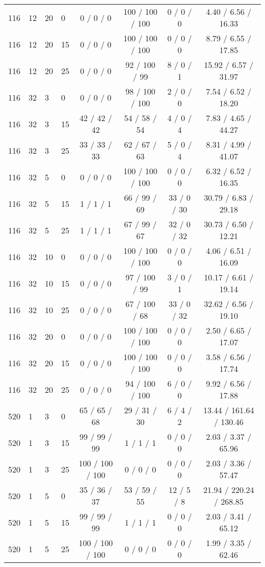 \begin{table}[p]
\begin{tabular}{llllcccc}
116 & 12 & 20 & 0 & 0 / 0 / 0 & 100 / 100 / 100 & 0 / 0 / 0 & 4.40 / 6.56 / 16.33 \\
116 & 12 & 20 & 15 & 0 / 0 / 0 & 100 / 100 / 100 & 0 / 0 / 0 & 8.79 / 6.55 / 17.85 \\
116 & 12 & 20 & 25 & 0 / 0 / 0 & 92 / 100 / 99 & 8 / 0 / 1 & 15.92 / 6.57 / 31.97 \\
116 & 32 & 3 & 0 & 0 / 0 / 0 & 98 / 100 / 100 & 2 / 0 / 0 & 7.54 / 6.52 / 18.20 \\
116 & 32 & 3 & 15 & 42 / 42 / 42 & 54 / 58 / 54 & 4 / 0 / 4 & 7.83 / 4.65 / 44.27 \\
116 & 32 & 3 & 25 & 33 / 33 / 33 & 62 / 67 / 63 & 5 / 0 / 4 & 8.31 / 4.99 / 41.07 \\
116 & 32 & 5 & 0 & 0 / 0 / 0 & 100 / 100 / 100 & 0 / 0 / 0 & 6.32 / 6.52 / 16.35 \\
116 & 32 & 5 & 15 & 1 / 1 / 1 & 66 / 99 / 69 & 33 / 0 / 30 & 30.79 / 6.83 / 29.18 \\
116 & 32 & 5 & 25 & 1 / 1 / 1 & 67 / 99 / 67 & 32 / 0 / 32 & 30.73 / 6.50 / 12.21 \\
116 & 32 & 10 & 0 & 0 / 0 / 0 & 100 / 100 / 100 & 0 / 0 / 0 & 4.06 / 6.51 / 16.09 \\
116 & 32 & 10 & 15 & 0 / 0 / 0 & 97 / 100 / 99 & 3 / 0 / 1 & 10.17 / 6.61 / 19.14 \\
116 & 32 & 10 & 25 & 0 / 0 / 0 & 67 / 100 / 68 & 33 / 0 / 32 & 32.62 / 6.56 / 19.10 \\
116 & 32 & 20 & 0 & 0 / 0 / 0 & 100 / 100 / 100 & 0 / 0 / 0 & 2.50 / 6.65 / 17.07 \\
116 & 32 & 20 & 15 & 0 / 0 / 0 & 100 / 100 / 100 & 0 / 0 / 0 & 3.58 / 6.56 / 17.74 \\
116 & 32 & 20 & 25 & 0 / 0 / 0 & 94 / 100 / 100 & 6 / 0 / 0 & 9.92 / 6.56 / 17.88 \\
520 & 1 & 3 & 0 & 65 / 65 / 68 & 29 / 31 / 30 & 6 / 4 / 2 & 13.44 / 161.64 / 130.46 \\
520 & 1 & 3 & 15 & 99 / 99 / 99 & 1 / 1 / 1 & 0 / 0 / 0 & 2.03 / 3.37 / 65.96 \\
520 & 1 & 3 & 25 & 100 / 100 / 100 & 0 / 0 / 0 & 0 / 0 / 0 & 2.03 / 3.36 / 57.47 \\
520 & 1 & 5 & 0 & 35 / 36 / 37 & 53 / 59 / 55 & 12 / 5 / 8 & 21.94 / 220.24 / 268.85 \\
520 & 1 & 5 & 15 & 99 / 99 / 99 & 1 / 1 / 1 & 0 / 0 / 0 & 2.03 / 3.41 / 65.12 \\
520 & 1 & 5 & 25 & 100 / 100 / 100 & 0 / 0 / 0 & 0 / 0 / 0 & 1.99 / 3.35 / 62.46 \\

\end{tabular}
\end{table}
